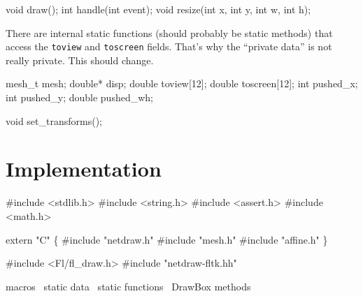 \nwendcode{}\nwdocspar

\nwenddocs{}\endmoddef
void draw();
int handle(int event);
void resize(int x, int y, int w, int h);

\nwendcode{}\nwdocspar

There are internal static functions (should probably be static methods)
that access the {\tt{}toview} and {\tt{}toscreen} fields.  That's why the %
``private data'' is not really private.  This should change.

\nwenddocs{}\endmoddef
mesh_t mesh;
double* disp;
double toview[12];
double toscreen[12];
int pushed_x;
int pushed_y;
double pushed_wh;

\nwendcode{}\nwdocspar

\nwenddocs{}\endmoddef
void set_transforms();
\nwendcode{}\nwdocspar


\section{Implementation}

\nwenddocs{}\endmoddef
#include <stdlib.h>
#include <string.h>
#include <assert.h>
#include <math.h>

extern "C" \{
#include "netdraw.h"
#include "mesh.h"
#include "affine.h"
\}

#include <Fl/fl_draw.h>
#include "netdraw-fltk.hh"

\LA{}macros~{\nwtagstyle{}}\RA{}
\LA{}static data~{\nwtagstyle{}}\RA{}
\LA{}static functions~{\nwtagstyle{}}\RA{}
\LA{}\code{}DrawBox\edoc{} methods~{\nwtagstyle{}}\RA{}
\nwendcode{}\nwdocspar

